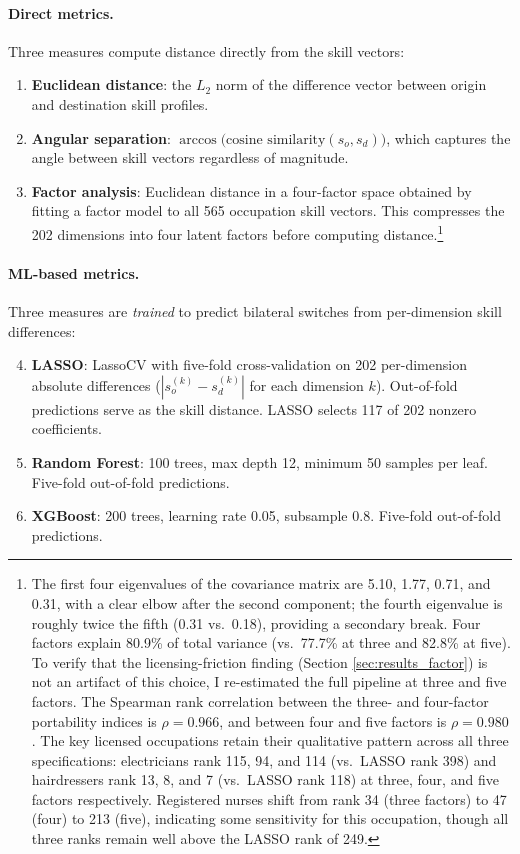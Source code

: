 \documentclass[12pt]{article}
\begin{document}
\paragraph{Direct metrics.} Three measures compute distance directly from the skill vectors:
\begin{enumerate}
    \item \textbf{Euclidean distance}: the $L_2$ norm of the difference vector between origin and destination skill profiles.
    \item \textbf{Angular separation}: $\arccos\!\bigl(\text{cosine similarity}(s_o, s_d)\bigr)$, which captures the angle between skill vectors regardless of magnitude.
    \item \textbf{Factor analysis}: Euclidean distance in a four-factor space obtained by fitting a factor model to all 565 occupation skill vectors. This compresses the 202 dimensions into four latent factors before computing distance.\footnote{The first four eigenvalues of the covariance matrix are 5.10, 1.77, 0.71, and 0.31, with a clear elbow after the second component; the fourth eigenvalue is roughly twice the fifth (0.31 vs.\ 0.18), providing a secondary break. Four factors explain 80.9\% of total variance (vs.\ 77.7\% at three and 82.8\% at five). To verify that the licensing-friction finding (Section \ref{sec:results_factor}) is not an artifact of this choice, I re-estimated the full pipeline at three and five factors. The Spearman rank correlation between the three- and four-factor portability indices is $\rho = 0.966$, and between four and five factors is $\rho = 0.980$. The key licensed occupations retain their qualitative pattern across all three specifications: electricians rank 115, 94, and 114 (vs.\ LASSO rank 398) and hairdressers rank 13, 8, and 7 (vs.\ LASSO rank 118) at three, four, and five factors respectively. Registered nurses shift from rank 34 (three factors) to 47 (four) to 213 (five), indicating some sensitivity for this occupation, though all three ranks remain well above the LASSO rank of 249.}
\end{enumerate}

\paragraph{ML-based metrics.} Three measures are \emph{trained} to predict bilateral switches from per-dimension skill differences:
\begin{enumerate}
    \setcounter{enumi}{3}
    \item \textbf{LASSO}: LassoCV with five-fold cross-validation on 202 per-dimension absolute differences ($|s_o^{(k)} - s_d^{(k)}|$ for each dimension $k$). Out-of-fold predictions serve as the skill distance. LASSO selects 117 of 202 nonzero coefficients.
    \item \textbf{Random Forest}: 100 trees, max depth 12, minimum 50 samples per leaf. Five-fold out-of-fold predictions.
    \item \textbf{XGBoost}: 200 trees, learning rate 0.05, subsample 0.8. Five-fold out-of-fold predictions.
\end{enumerate}
\end{document}
